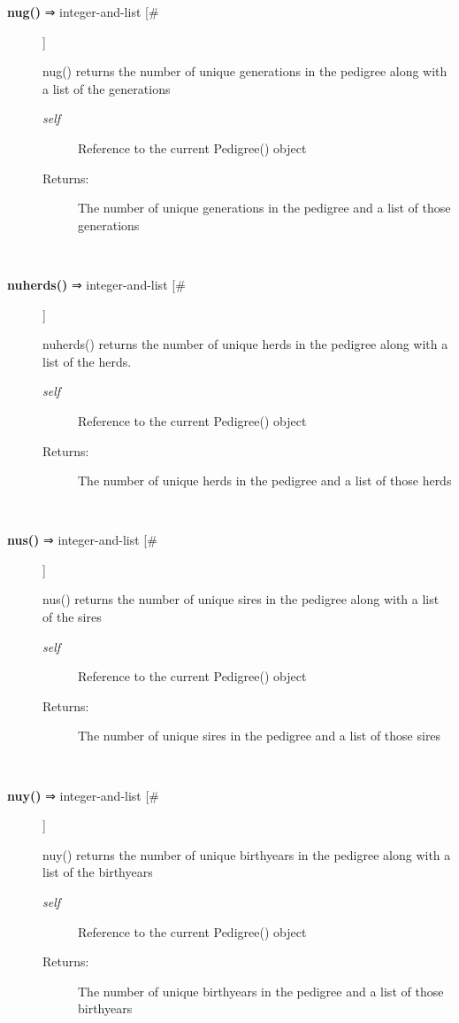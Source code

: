 \documentclass{article}
\begin{document}
\begin{description}
\item[\textbf{nug()} ⇒ integer-and-list [\#]
]
\par nug() returns the number of unique generations in the pedigree along with a list of the generations
\begin{description}
\item[\textit{self}
]
Reference to the current Pedigree() object
\item[Returns:
]
The number of unique generations in the pedigree and a list of those generations
\end{description}\\

\item[\textbf{nuherds()} ⇒ integer-and-list [\#]
]
\par nuherds() returns the number of unique herds in the pedigree along with a list of the herds.
\begin{description}
\item[\textit{self}
]
Reference to the current Pedigree() object
\item[Returns:
]
The number of unique herds in the pedigree and a list of those herds
\end{description}\\

\item[\textbf{nus()} ⇒ integer-and-list [\#]
]
\par nus() returns the number of unique sires in the pedigree along with a list of the sires
\begin{description}
\item[\textit{self}
]
Reference to the current Pedigree() object
\item[Returns:
]
The number of unique sires in the pedigree and a list of those sires
\end{description}\\

\item[\textbf{nuy()} ⇒ integer-and-list [\#]
]
\par nuy() returns the number of unique birthyears in the pedigree along with a list of the birthyears
\begin{description}
\item[\textit{self}
]
Reference to the current Pedigree() object
\item[Returns:
]
The number of unique birthyears in the pedigree and a list of those birthyears
\end{description}\\


\end{description}
\end{document}
